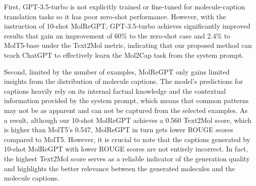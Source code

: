 \documentclass{article}
\theoremstyle{plain}
\theoremstyle{definition}
\theoremstyle{remark}
\begin{document}
\begin{table*}[htb]
    \centering
        \caption{Text-based molecule generation results on CheBI-20. Experimental results for Transformer, T5-base, and MolT5-base are retrieved from \cite{edwards-etal-2022-translation}. The \textbf{best} scores are in bold, and the \underline{second-best} scores are underlined.}
    \label{tab:c2m}

\end{table*}

First, GPT-3.5-turbo is not explicitly trained or fine-tuned for molecule-caption translation tasks so it has poor zero-shot performance. 
However, with the instruction of 10-shot MolReGPT, GPT-3.5-turbo achieves significantly improved results that gain an improvement of 60\% to the zero-shot case and 2.4\% to MolT5-base under the Text2Mol metric, indicating that our proposed method can teach ChatGPT to effectively learn the Mol2Cap task from the system prompt. 

Second, limited by the number of examples, MolReGPT only gains limited insights from the distribution of molecule captions.
The model's predictions for captions heavily rely on its internal factual knowledge and the contextual information provided by the system prompt, which means that common patterns may not be as apparent and can not be captured from the selected  examples. 
As a result, although our 10-shot MolReGPT achieves a 0.560 Text2Mol score, which is higher than MolT5's 0.547, MolReGPT in turn gets lower ROUGE scores compared to MolT5.
However, it is crucial to note that the captions generated by 10-shot MolReGPT with lower ROUGE scores are not entirely incorrect. 
In fact, the highest Text2Mol score serves as a reliable indicator of the generation quality and highlights the better relevance between the generated molecules and the molecule captions.
\end{document}
